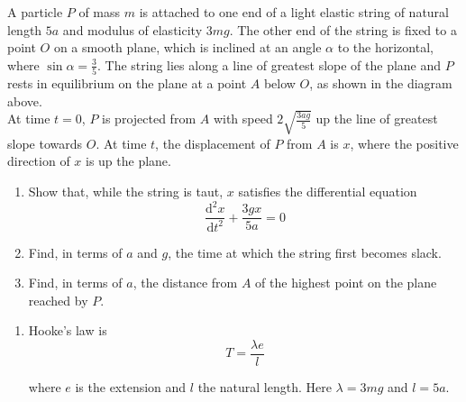 \documentclass[leqno]{article}
\begin{document}
\begin{enumerate}[
  label=\textbf{\arabic*.},
  leftmargin=*,
  topsep=0pt,
  partopsep=0pt,
  parsep=0pt
]
\begin{figure}[H]
\end{figure}


A particle $P$ of mass $m$ is attached to one end of a light elastic string of natural length $5a$ and modulus of elasticity $3mg$. The other end of the string is fixed to a point $O$ on a smooth plane, which is inclined at an angle $\alpha$ to the horizontal, where $\sin\alpha=\frac{3}{5}$. The string lies along a line of greatest slope of the plane and $P$ rests in equilibrium on the plane at a point $A$ below $O$, as shown in the diagram above. \\
At time $t=0$, $P$ is projected from $A$ with speed $2\sqrt{\frac{3ag}{5}}$ up the line of greatest slope towards $O$. At time $t$, the displacement of $P$ from $A$ is $x$, where the positive direction of $x$ is up the plane. \\
\begin{enumerate}[label=\textbf{(\alph*)}]
\item Show that, while the string is taut, $x$ satisfies the differential equation
\[
\frac{\mathrm{d}^2x}{\mathrm{d}t^2}+\frac{3gx}{5a}=0
\] 
\item Find, in terms of $a$ and $g$, the time at which the string first becomes slack.  \\
\item Find, in terms of $a$, the distance from $A$ of the highest point on the plane reached by $P$.  \\
\end{enumerate}

\vspace*{10pt}

\begin{djsSolution}
\begin{enumerate}[label=\textbf{(\alph*)}, start=1]
\item Hooke's law is
\[
T=\frac{\lambda e}{l}
\]

where \(e\) is the extension and \(l\) the natural length. Here \(\lambda=3mg\) and \(l=5a\).


\end{enumerate}
\end{djsSolution}
\end{enumerate}
\end{document}
